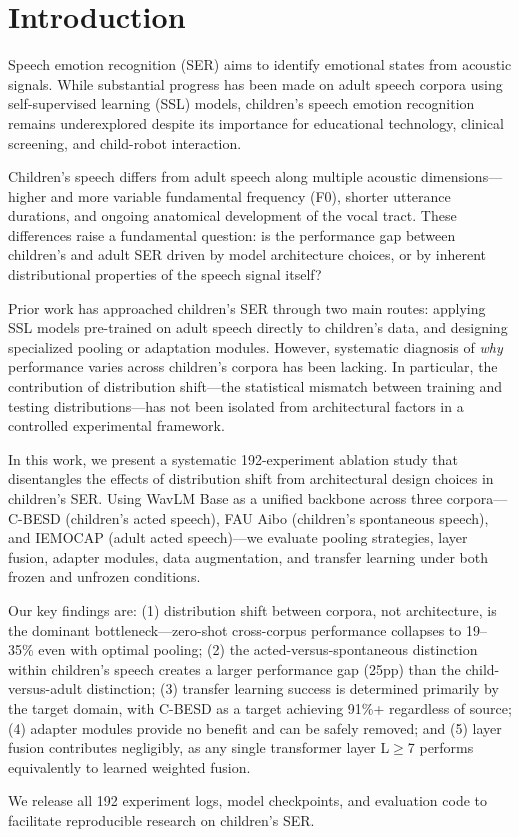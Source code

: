 \section{Introduction}

Speech emotion recognition (SER) aims to identify emotional states from acoustic signals. While substantial progress has been made on adult speech corpora using self-supervised learning (SSL) models, children's speech emotion recognition remains underexplored despite its importance for educational technology, clinical screening, and child-robot interaction.

Children's speech differs from adult speech along multiple acoustic dimensions---higher and more variable fundamental frequency (F0), shorter utterance durations, and ongoing anatomical development of the vocal tract. These differences raise a fundamental question: is the performance gap between children's and adult SER driven by model architecture choices, or by inherent distributional properties of the speech signal itself?

Prior work has approached children's SER through two main routes: applying SSL models pre-trained on adult speech directly to children's data, and designing specialized pooling or adaptation modules. However, systematic diagnosis of \textit{why} performance varies across children's corpora has been lacking. In particular, the contribution of distribution shift---the statistical mismatch between training and testing distributions---has not been isolated from architectural factors in a controlled experimental framework.

In this work, we present a systematic 192-experiment ablation study that disentangles the effects of distribution shift from architectural design choices in children's SER. Using WavLM Base as a unified backbone across three corpora---C-BESD (children's acted speech), FAU Aibo (children's spontaneous speech), and IEMOCAP (adult acted speech)---we evaluate pooling strategies, layer fusion, adapter modules, data augmentation, and transfer learning under both frozen and unfrozen conditions.

Our key findings are: (1) distribution shift between corpora, not architecture, is the dominant bottleneck---zero-shot cross-corpus performance collapses to 19--35\% even with optimal pooling; (2) the acted-versus-spontaneous distinction within children's speech creates a larger performance gap (25pp) than the child-versus-adult distinction; (3) transfer learning success is determined primarily by the target domain, with C-BESD as a target achieving 91\%+ regardless of source; (4) adapter modules provide no benefit and can be safely removed; and (5) layer fusion contributes negligibly, as any single transformer layer L$\geq$7 performs equivalently to learned weighted fusion.

We release all 192 experiment logs, model checkpoints, and evaluation code to facilitate reproducible research on children's SER.
